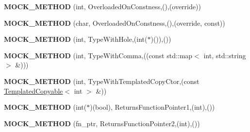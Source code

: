 \begin{DoxyCompactItemize}
\mbox{\label{classtesting_1_1gmock__function__mocker__test_1_1MockFoo_a57a7faaeec9d76031292fa532c35c0c6}} 
{\bfseries M\+O\+C\+K\+\_\+\+M\+E\+T\+H\+OD} (int, Overloaded\+On\+Constness,(),(override))
\item 
\mbox{\label{classtesting_1_1gmock__function__mocker__test_1_1MockFoo_a83b1f88fdda3669b8c600daee345bbbc}} 
{\bfseries M\+O\+C\+K\+\_\+\+M\+E\+T\+H\+OD} (char, Overloaded\+On\+Constness,(),(override, const))
\item 
\mbox{\label{classtesting_1_1gmock__function__mocker__test_1_1MockFoo_a0a0a46aa356c5f7314a37fc1a4d16720}} 
{\bfseries M\+O\+C\+K\+\_\+\+M\+E\+T\+H\+OD} (int, Type\+With\+Hole,(int($\ast$)()),())
\item 
\mbox{\label{classtesting_1_1gmock__function__mocker__test_1_1MockFoo_ab6c0fd6e1285132fb787053cd89ec5ab}} 
{\bfseries M\+O\+C\+K\+\_\+\+M\+E\+T\+H\+OD} (int, Type\+With\+Comma,((const std\+::map$<$ int, std\+::string $>$ \&)))
\item 
\mbox{\label{classtesting_1_1gmock__function__mocker__test_1_1MockFoo_a887e304dcf8658b35634a7a547fad991}} 
{\bfseries M\+O\+C\+K\+\_\+\+M\+E\+T\+H\+OD} (int, Type\+With\+Templated\+Copy\+Ctor,(const \mbox{\hyperlink{classtesting_1_1gmock__function__mocker__test_1_1TemplatedCopyable}{Templated\+Copyable}}$<$ int $>$ \&))
\item 
\mbox{\label{classtesting_1_1gmock__function__mocker__test_1_1MockFoo_af221e9f514688078a4a5ec383c853ff4}} 
{\bfseries M\+O\+C\+K\+\_\+\+M\+E\+T\+H\+OD} (int($\ast$)(bool), Returns\+Function\+Pointer1,(int),())
\item 
\mbox{\label{classtesting_1_1gmock__function__mocker__test_1_1MockFoo_a89a925c04db716d77b10b5551e45f113}} 
{\bfseries M\+O\+C\+K\+\_\+\+M\+E\+T\+H\+OD} (fn\+\_\+ptr, Returns\+Function\+Pointer2,(int),())
\item 

\end{DoxyCompactItemize}
